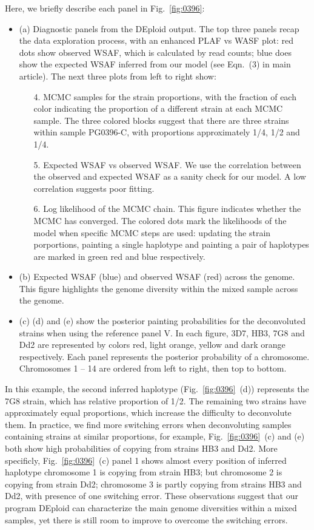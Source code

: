 \documentclass{article}
\begin{document}
Here, we briefly describe each panel in Fig.~\ref{fig:0396}:
\begin{itemize}

\item (a) Diagnostic panels from the {\textmd DEploid} output. The top three panels recap the data exploration process, with an enhanced PLAF vs WASF plot: red dots show observed WSAF, which is calculated by read counts; blue does show the expected WSAF inferred from our model (see Eqn.~(3) in main article). The next three plots from left to right show:
\begin{enumerate}
\item[4.] MCMC samples for the strain proportions, with the fraction of each color indicating the proportion of a different strain at each MCMC sample. The three colored blocks suggest that there are three strains within sample {\textmd PG0396-C}, with proportions approximately 1/4, 1/2 and 1/4.
\item[5.] Expected WSAF vs observed WSAF. We use the correlation between the observed and expected WSAF as a sanity check for our model. A low correlation suggests poor fitting.
\item[6.] Log likelihood of the MCMC chain. This figure indicates whether the MCMC has converged. The colored dots mark the likelihoods of the model when specific MCMC steps are used: updating the strain porportions, painting a single haplotype and painting a pair of haplotypes are marked in green red and blue respectively.

\end{enumerate}
\item (b) Expected WSAF (blue) and observed WSAF (red) across the genome. This figure highlights the genome diversity within the mixed sample across the genome.
\item (c) (d) and (e) show the posterior painting probabilities for the deconvoluted strains when using the reference panel V. In each figure, 3D7, HB3, 7G8 and Dd2 are represented by colors red, light orange, yellow and dark orange respectively. Each panel represents the posterior probability of a chromosome. Chromosomes 1 -- 14 are ordered from left to right, then top to bottom.
\end{itemize}

In this example, the second inferred haplotype (Fig.~\ref{fig:0396}~(d)) represents the 7G8 strain, which has relative proportion of 1/2. The remaining two strains have approximately equal proportions, which increase the difficulty to deconvolute them. In practice, we find more switching errors when deconvoluting samples containing strains at similar proportions, for example, Fig.~\ref{fig:0396}~(c) and (e) both show high probabilities of copying from strains HB3 and Dd2. More specificly, Fig.~\ref{fig:0396}~(c) panel 1 shows almost every position of inferred haplotype chromosome 1 is copying from strain HB3; but chromosome 2 is copying from strain Dd2; chromosome 3 is partly copying from strains HB3 and Dd2, with presence of one switching error. These observations suggest that our program DEploid can characterize the main genome diversities within a mixed samples, yet there is still room to improve to overcome the switching errors.
\end{document}
